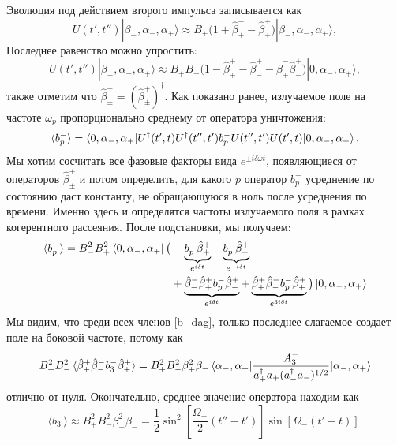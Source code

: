 Эволюция под действием второго импульса записывается как 
\begin{equation}
	U(t',t'') |\beta_-,\alpha_-,\alpha_+\rangle \approx B_+ \bigg(1 + \hat{\beta}^-_+ - \hat{\beta}^+_+\bigg)  |\beta_-,\alpha_-,\alpha_+\rangle, 
	\label{Utt}
\end{equation}
Последнее равенство можно упростить: 
\begin{equation}
	U(t',t'') |\beta_-,\alpha_-,\alpha_+\rangle \approx B_+ B_- \Big(1 - \hat\beta^+_+  - \hat\beta^+_- - \hat\beta^-_+ \hat\beta^+_-\Big)|0,\alpha_-,\alpha_+\rangle, 
\end{equation}
также отметим что $\hat\beta^-_\pm =(\hat\beta^+_\pm)^\dag$. Как показано ранее, излучаемое поле на частоте $\omega_p$ пропорционально среднему от оператора уничтожения:
\begin{equation}
	\braket{b^-_p} = \braket{0,\alpha_-,\alpha_+|U^\dag(t',t)U^\dag(t'',t') b^-_p U(t'',t')U(t',t)|0, \alpha_-, \alpha_+}.
\end{equation}
Мы хотим сосчитать все фазовые факторы вида $e^{\pm i\delta\omega t}$, появляющиеся от операторов $\hat{\beta}^{\pm}_{\pm}$ и потом определить, для какого $p$ оператор $b^-_{p}$ усреднение по состоянию даст константу, не обращающуюся в ноль после усреднения по времени. Именно здесь и определятся частоты излучаемого поля в рамках когерентного рассеяния. После подстановки, мы получаем:
\begin{equation}
	\begin{split}
	\braket{b^-_p} = B_-^2B_+^2\bra{0,\alpha_-,\alpha_+}\big(
		&-\underbrace{b^-_p\hat{\beta}^+_+}_{e^{i\delta t}}
		-\underbrace{b^-_p\hat{\beta}^+_- }_{e^{-i\delta t}} \\
		&+\underbrace{\hat{\beta}^-_- \hat{\beta}^+_+ b^-_p  \hat{\beta}^+_-}_{e^{i\delta t}} 
		+\underbrace{\hat{\beta}^+_+ \hat{\beta}^-_-b^-_p\hat{\beta}^+_+  }_{e^{3i\delta t}}
		\big) \ket{0,\alpha_-,\alpha_+}
	\label{b_dag}
	\end{split}
\end{equation}
Мы видим, что среди всех членов \eqref{b_dag}, только последнее слагаемое создает поле на боковой частоте, потому как
\begin{equation}
	B_+^2 B_-^2\braket{\hat{\beta}^+_+ \hat{\beta}^-_-b^-_3\hat{\beta}^+_+ } = B_+^2 B_-^2\beta^2_+\beta_-\braket{\alpha_-,\alpha_+| \frac{A^-_{3}}{a^\dagger_+ a_+(a^\dagger_- a_-)^{1/2}}|\alpha_-,\alpha_+}
\end{equation}
отлично от нуля. 
Окончательно, среднее значение оператора находим как 
\begin{equation}
	\label{b3}
	\langle b^-_3 \rangle \approx B_+^2 B_-^2 \beta_+^2\beta_- = \frac{1}{2}\sin^2\left[\frac{\Omega_+}{2} (t''-t')\right]\sin\left[\Omega_- (t'-t)\right].
\end{equation}
